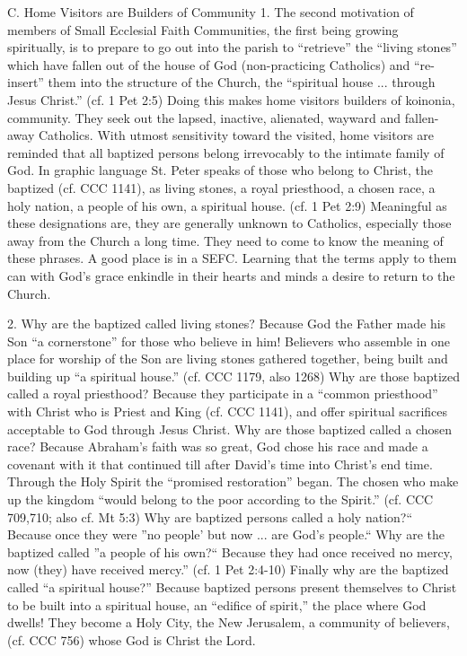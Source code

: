 \documentclass[oneside]{book}
\begin{document}
C. Home Visitors are Builders of Community
1. The second motivation of members of Small Ecclesial Faith Communities, the
first being growing spiritually, is to prepare to go out into the parish to
``retrieve'' the ``living stones'' which have fallen out of the house of God
(non-practicing Catholics) and ``re-insert'' them into the structure of the
Church, the ``spiritual house ... through Jesus Christ.'' (cf. 1 Pet 2:5) Doing
this makes home visitors builders of koinonia, community. They seek out the
lapsed, inactive, alienated, wayward and fallen-away Catholics. With utmost
sensitivity toward the visited, home visitors are reminded that all baptized
persons belong irrevocably to the intimate family of God.
In graphic language St. Peter speaks of those who belong to Christ, the baptized
(cf. CCC 1141), as living stones, a royal priesthood, a chosen race, a holy
nation, a people of his own, a spiritual house. (cf. 1 Pet 2:9) Meaningful as
these designations are, they are generally unknown to Catholics, especially
those away from the Church a long time. They need to come to know the meaning of
these phrases. A good place is in a SEFC. Learning that the terms apply to them
can with God's grace enkindle in their hearts and minds a desire to return to
the Church.

2. Why are the baptized called living stones? Because God the Father made his
Son ``a cornerstone'' for those who believe in him! Believers who assemble in
one place for worship of the Son are living stones gathered together, being
built and building up ``a spiritual house.'' (cf. CCC 1179, also 1268) Why are
those baptized called a royal priesthood? Because they participate in a ``common
priesthood'' with Christ who is Priest and King (cf. CCC 1141), and offer
spiritual sacrifices acceptable to God through Jesus Christ. Why are those
baptized called a chosen race? Because Abraham's faith was so great, God chose
his race and made a covenant with it that continued till after David's time into
Christ's end time. Through the Holy Spirit the ``promised restoration'' began.
The chosen who make up the kingdom ``would belong to the poor according to the
Spirit.'' (cf. CCC 709,710; also cf. Mt 5:3) Why are baptized persons called a
holy nation?`` Because once they were ''no people' but now ... are God's
people.`` Why are the baptized called ''a people of his own?`` Because they had
once received no mercy, now (they) have received mercy.'' (cf. 1 Pet 2:4-10)
Finally why are the baptized called ``a spiritual house?'' Because baptized
persons present themselves to Christ to be built into a spiritual house, an
``edifice of spirit,'' the place where God dwells! They become a Holy City, the
New Jerusalem, a community of believers, (cf. CCC 756) whose God is Christ the Lord.
\end{document}

